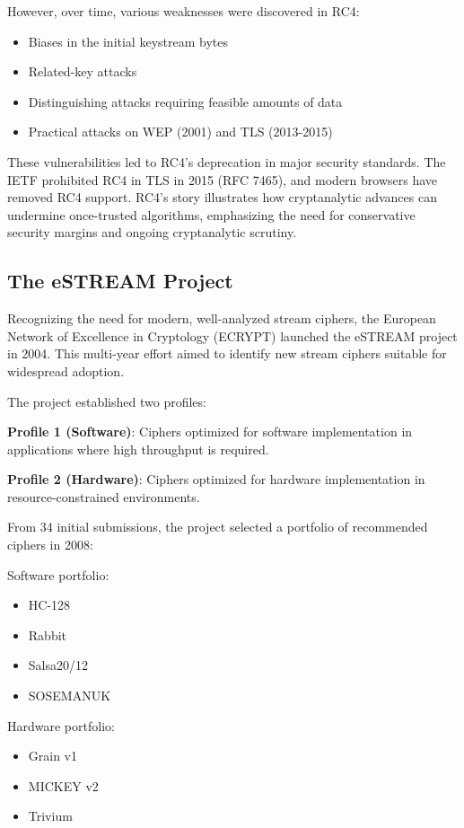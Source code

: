 \documentclass[12pt,a4paper,oneside]{report}
\begin{document}
However, over time, various weaknesses were discovered in RC4:

\begin{itemize}
    \item Biases in the initial keystream bytes
    \item Related-key attacks
    \item Distinguishing attacks requiring feasible amounts of data
    \item Practical attacks on WEP (2001) and TLS (2013-2015)
\end{itemize}

These vulnerabilities led to RC4's deprecation in major security standards. The IETF prohibited RC4 in TLS in 2015 (RFC 7465), and modern browsers have removed RC4 support. RC4's story illustrates how cryptanalytic advances can undermine once-trusted algorithms, emphasizing the need for conservative security margins and ongoing cryptanalytic scrutiny.

\subsection{The eSTREAM Project}

Recognizing the need for modern, well-analyzed stream ciphers, the European Network of Excellence in Cryptology (ECRYPT) launched the eSTREAM project in 2004. This multi-year effort aimed to identify new stream ciphers suitable for widespread adoption.

The project established two profiles:

\textbf{Profile 1 (Software)}: Ciphers optimized for software implementation in applications where high throughput is required.

\textbf{Profile 2 (Hardware)}: Ciphers optimized for hardware implementation in resource-constrained environments.

From 34 initial submissions, the project selected a portfolio of recommended ciphers in 2008:

Software portfolio:
\begin{itemize}
    \item HC-128
    \item Rabbit
    \item Salsa20/12
    \item SOSEMANUK
\end{itemize}

Hardware portfolio:
\begin{itemize}
    \item Grain v1
    \item MICKEY v2
    \item Trivium
\end{itemize}
\end{document}
